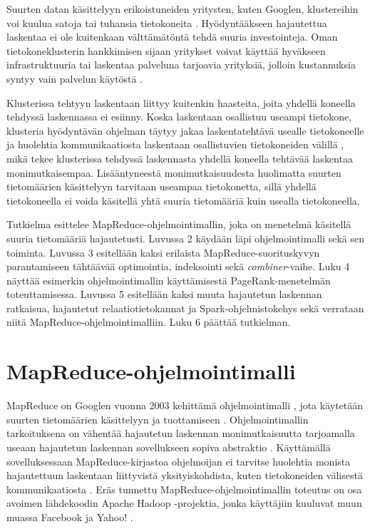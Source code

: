 \documentclass[finnish]{templates/tktltiki2}
\theoremstyle{definition}
\theoremstyle{remark}
\begin{document}
Suurten datan käsittelyyn erikoistuneiden yritysten, kuten Googlen,
klustereihin voi kuulua satoja tai tuhansia tietokoneita
\cite{mapreduce}. Hyödyntääkseen hajautettua laskentaa ei ole
kuitenkaan välttämätöntä tehdä suuria investointeja. Oman
tietokoneklusterin hankkimisen sijaan yritykset voivat käyttää hyväkseen
infrastruktuuria tai laskentaa palveluna tarjoavia yrityksiä, jolloin
kustannuksia syntyy vain palvelun käytöstä \cite{cloudcomputing}.

Klusterissa tehtyyn laskentaan liittyy kuitenkin haasteita, joita
yhdellä koneella tehdyssä laskennassa ei esiinny. Koska laskentaan
osallistuu useampi tietokone, klusteria hyödyntävän ohjelman täytyy
jakaa laskentatehtävä usealle tietokoneelle ja huolehtia
kommunikaatiosta laskentaan osallistuvien tietokoneiden välillä
\cite{cluster-grid-cloud}, mikä tekee klusterissa tehdyssä
laskennasta yhdellä koneella tehtävää laskentaa monimutkaisempaa.
Lisääntyneestä monimutkaisuudesta huolimatta suurten tietomäärien
käsittelyyn tarvitaan useampaa tietokonetta, sillä yhdellä tietokoneella
ei voida käsitellä yhtä suuria tietomääriä kuin usealla tietokoneella.

Tutkielma esittelee MapReduce-ohjelmointimallin, joka on menetelmä
käsitellä suuria tietomääriä hajautetusti. Luvussa 2 käydään läpi
ohjelmointimalli sekä sen toiminta. Luvussa 3 esitellään kaksi erilaista
MapReduce-suorituskyvyn parantamiseen tähtäävää optimointia, indeksointi
sekä \emph{combiner}-vaihe. Luku 4 näyttää esimerkin ohjelmointimallin
käyttämisestä PageRank-menetelmän toteuttamisessa. Luvussa 5 esitellään
kaksi muuta hajautetun laskennan ratkaisua, hajautetut
relaatiotietokannat ja Spark-ohjelmistokehys sekä verrataan niitä
MapReduce-ohjelmointimalliin. Luku 6 päättää tutkielman.

\section{MapReduce-ohjelmointimalli}\label{mapreduce-ohjelmointimalli}

MapReduce on Googlen vuonna 2003 kehittämä ohjelmointimalli \cite{mapreduce2}, jota käytetään suurten tietomäärien käsittelyyn ja
tuottamiseen \cite{mapreduce}. Ohjelmointimallin
tarkoituksena on vähentää hajautetun laskennan monimutkaisuutta
tarjoamalla useaan hajautetun laskennan sovellukseen sopiva abstraktio
\cite{mapreduce}. Käyttämällä sovelluksessaan
MapReduce-kirjastoa ohjelmoijan ei tarvitse huolehtia monista
hajautettuun laskentaan liittyvistä yksityiskohdista, kuten
tietokoneiden välisestä kommunikaatiosta \cite{mapreduce}.
Eräs tunnettu MapReduce-ohjelmointimallin toteutus on osa avoimen
lähdekoodin Apache Hadoop -projektia, jonka käyttäjiin kuuluvat muun
muassa Facebook ja Yahoo! \cite{hive}.
\end{document}
